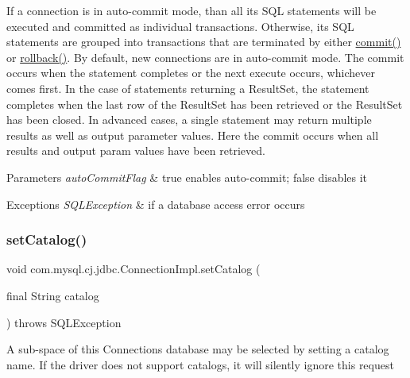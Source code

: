 If a connection is in auto-\/commit mode, than all its S\+QL statements will be executed and committed as individual transactions. Otherwise, its S\+QL statements are grouped into transactions that are terminated by either \mbox{\hyperlink{classcom_1_1mysql_1_1cj_1_1jdbc_1_1_connection_impl_ac6218bc1a284e67ff9557bdefc52c388}{commit()}} or \mbox{\hyperlink{classcom_1_1mysql_1_1cj_1_1jdbc_1_1_connection_impl_adb29692483164e8c98dbeb9c6eb5a972}{rollback()}}. By default, new connections are in auto-\/commit mode. The commit occurs when the statement completes or the next execute occurs, whichever comes first. In the case of statements returning a Result\+Set, the statement completes when the last row of the Result\+Set has been retrieved or the Result\+Set has been closed. In advanced cases, a single statement may return multiple results as well as output parameter values. Here the commit occurs when all results and output param values have been retrieved.


\begin{DoxyParams}{Parameters}
{\em auto\+Commit\+Flag} & true enables auto-\/commit; false disables it \\
\hline
\end{DoxyParams}

\begin{DoxyExceptions}{Exceptions}
{\em S\+Q\+L\+Exception} & if a database access error occurs \\
\hline
\end{DoxyExceptions}
\mbox{\label{classcom_1_1mysql_1_1cj_1_1jdbc_1_1_connection_impl_aa496cdf7782256493c7bddd156d9b75d}} 
\subsubsection{\texorpdfstring{set\+Catalog()}{setCatalog()}}
{\footnotesize\ttfamily void com.\+mysql.\+cj.\+jdbc.\+Connection\+Impl.\+set\+Catalog (\begin{DoxyParamCaption}\item[{final String}]{catalog }\end{DoxyParamCaption}) throws S\+Q\+L\+Exception}

A sub-\/space of this Connection\textquotesingle{}s database may be selected by setting a catalog name. If the driver does not support catalogs, it will silently ignore this request 

